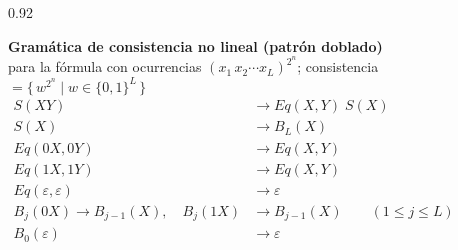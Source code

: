 \documentclass[border=12pt]{standalone}
\newcommand{\Eq}{\mathit{Eq}}
\begin{document}
\begin{varwidth}{0.92\linewidth}
\centering

{\large\bfseries Gramática de consistencia no lineal (patrón doblado)}\\[2pt]
{\normalsize para la fórmula con ocurrencias $(x_1\,x_2\cdots x_L)^{2^n}$;\;
consistencia $=\{\,w^{2^n}\mid w\in\{0,1\}^L\,\}$}\\[14pt]

$\displaystyle
\begin{aligned}
  S(XY) &\to \Eq(X,Y)\; S(X) \\[4pt]
  S(X) &\to B_L(X) \\[8pt]
  \Eq(0X,0Y) &\to \Eq(X,Y) \\[4pt]
  \Eq(1X,1Y) &\to \Eq(X,Y) \\[4pt]
  \Eq(\varepsilon,\varepsilon) &\to \varepsilon \\[8pt]
  B_j(0X) \to B_{j-1}(X), \quad B_j(1X) &\to B_{j-1}(X) \qquad (1\le j\le L) \\[4pt]
  B_0(\varepsilon) &\to \varepsilon
\end{aligned}$

\end{varwidth}
\end{document}
